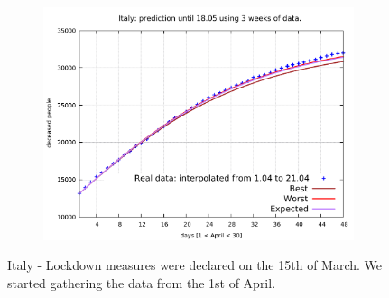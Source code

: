 \documentclass[8pt]{article}
\begin{document}
\begin{figure}[h!]
\begin{subfigure}[b]{0.45\linewidth}
  \includegraphics[width=\linewidth]{../simulations_v1/it/1-21/1-21.pdf}
  \end{subfigure}
	\caption{Italy - Lockdown measures were declared on the 15th of March.
                We started gathering the data from the 1st of April.}
\end{figure}
\end{document}
